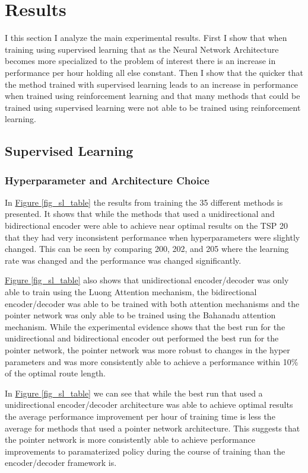 \documentclass[12pt]{article}
\begin{document}

\section{Results}

I this section I analyze the main experimental results. First I show that when training using supervised learning that as the Neural Network Architecture becomes more specialized to the problem of interest there is an increase in performance per hour holding all else constant. Then I show that the quicker that the method trained with supervised learning leads to an increase in performance when trained using reinforcement learning and that many methods that could be trained using supervised learning were not able to be trained using reinforcement learning.

\subsection{Supervised Learning}

\subsubsection{Hyperparameter and Architecture Choice}

In \hyperref[fig_sl_table]{Figure \ref{fig_sl_table}} the results from training the 35 different methods is presented. It shows that while the methods that used a unidirectional and bidirectional encoder were able to achieve near optimal results on the TSP 20 that they had very inconsistent performance when hyperparameters were slightly changed. This can be seen by comparing 200, 202, and 205 where the learning rate was changed and the performance was changed significantly.

\hyperref[fig_sl_table]{Figure \ref{fig_sl_table}} also shows that unidirectional encoder/decoder was only able to train using the Luong Attention mechanism, the bidirectional encoder/decoder was able to be trained with both attention mechanisms and the pointer network was only able to be trained using the Bahanadu attention mechanism. While the experimental evidence shows that the best run for the unidirectional and bidirectional encoder out performed the best run for the pointer network, the pointer network was more robust to changes in the hyper parameters and was more consistently able to achieve a performance within 10\% of the optimal route length.

In \hyperref[fig_sl_table]{Figure \ref{fig_sl_table}} we can see that while the best run that used a unidirectional encoder/decoder architecture was able to achieve optimal results the average performance improvement per hour of training time is less the average for methods that used a pointer network architecture. This suggests that the pointer network is more consistently able to achieve performance improvements to paramaterized policy during the course of training than the encoder/decoder framework is.
\end{document}
